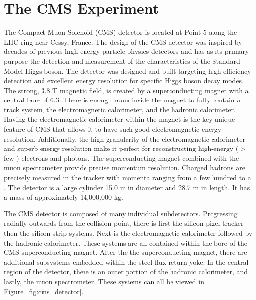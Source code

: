 \section{The CMS Experiment}
\label{sec:cms}
The Compact Muon Solenoid (CMS) detector is located at Point 5 along the LHC ring near Cessy, France. The
design of the CMS detector was inspired by decades of previous high energy particle physics detectors and has as its
primary purpose the detection and measurement of the characteristics of the Standard Model Higgs boson. The 
detector was designed and built targeting high efficiency detection and excellent energy resolution for specific Higgs 
boson decay modes. 
The strong, 3.8 T magnetic field, is created by a superconducting magnet with a central bore of 6.3\m.
There is enough room inside the magnet to fully contain a track system, the electromagnetic calorimeter, and
the hadronic calorimeter. Having the electromagnetic calorimeter within the magnet is the key unique feature of 
CMS that allows it to have such good electromagnetic energy resolution. 
Additionally, the high granularity of the electromagnetic calorimeter and superb energy
resolution make it perfect for reconstructing high-energy ($>$ few \GeV) electrons and photons. 
The superconducting magnet combined with the muon spectrometer provide precise momentum
resolution. Charged hadrons are precisely measured in the tracker with momenta ranging from a few 
hundred \MeV to a \TeV. The detector is a large
cylinder 15.0 m in diameter and 28.7 m in length. It has a mass of approximately 14,000,000 kg.

The CMS detector is composed of many individual subdetectors. Progressing radially outwards from the collision point,
there is first the silicon pixel tracker then the silicon strip systems. Next is the 
electromagnetic calorimeter followed by the hadronic calorimeter. These systems are all contained
within the bore of the CMS superconducting magnet. After the the superconducting magnet, there are additional subsystems
embedded within the steel flux-return yoke. In the central region of the detector, there is an 
outer portion of the hadronic calorimeter, and lastly, the muon spectrometer. These systems can all be viewed in
Figure~\ref{fig:cms_detector}.

